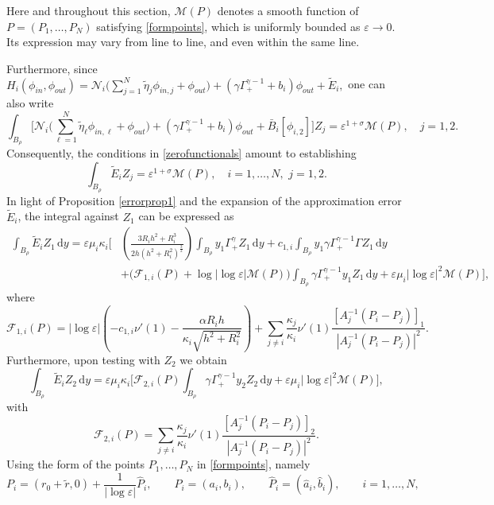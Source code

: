 \documentclass[11pt,reqno,a4paper]{amsart}
\numberwithin{equation}{section}
\def\dd{{\mathrm{d}}}
\newcommand{\ve}{\varepsilon}
\begin{document}
Here and throughout this section, $\mathcal{M}(P)$ denotes a smooth function of $P=(P_1,\dots,P_N)$ satisfying \eqref{formpoints}, which is uniformly bounded as $\ve\to 0$. Its expression may vary from line to line, and even within the same line.

Furthermore, since $H_i(\phi_{in},\phi_{out})=\mathcal{N}_i\Big(\sum\limits_{j=1}^{N}\tilde{\eta}_j\phi_{in,j}+\phi_{out}\Big)+\left(\gamma\Gamma^{\gamma-1}_{+}+b_i\right)\phi_{out}+\widetilde{E}_i,$ one can also write
\[\int_{B_{\rho}} \bigg[\mathcal{N}_i\Big(\sum_{\ell=1}^{N}\tilde{\eta}_{\ell}\phi_{in,\ell}+\phi_{out}\Big)+\left(\gamma\Gamma^{\gamma-1}_{+}+b_i\right)\phi_{out}+\bar{B}_i[\phi_{i,2}]\bigg]Z_j =\ve^{1+\sigma}\mathcal{M}(P), \quad j=1,2.\]
Consequently, the conditions in \eqref{zerofunctionals} amount to establishing
\begin{equation}\label{conderror}
    \int_{B_{\rho}} \widetilde{E}_i Z_j=\ve^{1+\sigma}\mathcal{M}(P), \quad i=1,\dots,N,\,\, j=1,2.
\end{equation}
In light of Proposition \ref{errorprop1} and the expansion of the approximation error $\widetilde{E}_i$, the integral against $Z_1$ can be expressed as
\begin{equation*}
\begin{aligned}
   \int_{B_{\rho}}\widetilde{E}_iZ_1 \,\dd y= \ve\mu_i\kappa_i\Bigg[&\left(\frac{3R_i h^2+R_i^3}{2h(h^2+R_i^2)^{\frac 3 2}}\right)\int_{B_{\rho}}y_1\Gamma^{\gamma}_{+}Z_1 \, \dd y+c_{1,i}\int_{B_{\rho}}y_1\gamma\Gamma^{\gamma-1}_{+}\Gamma Z_1 \, \dd y\\
   &+\big(\mathcal{F}_{1,i}\left(P\right)+\log|\log\ve|\mathcal{M}(P)\big)\int_{B_{\rho}}\gamma\Gamma^{\gamma-1}_{+}y_1Z_1\,\dd y+ \ve\mu_i |\log\ve|^2\mathcal{M}(P)\Bigg],
\end{aligned}
\end{equation*}
where \[\mathcal{F}_{1,i}(P)=|\log\ve|\left(-c_{1,i}\nu'(1)-\frac{\alpha R_i h}{\kappa_i\sqrt{h^2+R_i^2}}\right)+\sum_{j\neq i}\frac{\kappa_j}{\kappa_i}\nu'(1)\frac{[A_j^{-1}(P_i-P_j)]_1}{|A_j^{-1}(P_i-P_j)|^2}.\]
Furthermore, upon testing with $Z_2$ we obtain
\[\int_{B_{\rho}} \widetilde{E}_i Z_2 \, \dd y=\ve \mu_i \kappa_i \Bigg[\mathcal{F}_{2,i}(P)\int_{B_{\rho}}\gamma\Gamma^{\gamma-1}_{+}y_2Z_2\,\dd y +\ve\mu_i|\log\ve|^2\mathcal{M}(P)\bigg],\]
with \[\mathcal{F}_{2,i}(P)=\sum_{j \neq i} \frac{\kappa_j}{\kappa_i}\nu'(1)\frac{[A_j^{-1}(P_i-P_j)]_2}{|A_j^{-1}(P_i-P_j)|^2}.\]
Using the form of the points $P_1,\dots,P_N$ in \eqref{formpoints}, namely
\begin{equation*}
P_i=(r_0+\tilde{r},0)+\frac{1}{|\log\ve|}\widehat{P}_{i},\qquad P_i=(a_i,b_i),\qquad \widehat{P}_i=(\hat{a}_i,\hat{b}_i) , \qquad i=1,\dots,N,
\end{equation*}
\end{document}
